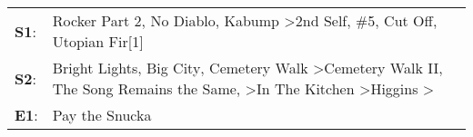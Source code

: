 \begin{supertabular}{p{0.03\textwidth}p{0.92\textwidth}}
 \textbf{S1}:  &                                                                                                                 Rocker Part 2\textsuperscript{}, \enspace No Diablo\textsuperscript{}, \enspace Kabump\textsuperscript{} \textgreater \enspace 2nd Self\textsuperscript{}, \enspace \#5\textsuperscript{}, \enspace Cut Off\textsuperscript{}, \enspace Utopian Fir[1]\textsuperscript{}  \enspace  \\
 \textbf{S2}:  &  Bright Lights, Big City\textsuperscript{}, \enspace Cemetery Walk\textsuperscript{} \textgreater \enspace Cemetery Walk II\textsuperscript{}, \enspace The Song Remains the Same\textsuperscript{}, \textsuperscript{} \textgreater \enspace In The Kitchen\textsuperscript{} \textgreater \enspace Higgins\textsuperscript{} \textgreater {}\textsuperscript{}  \enspace  \\
 \textbf{E1}:  &                                                                                                                                                                                                                                                                                                                                                         Pay the Snucka\textsuperscript{}  \enspace  \\
\end{supertabular}
